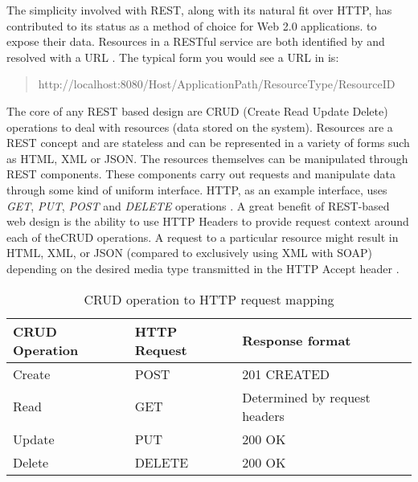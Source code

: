 The simplicity involved with REST, along with its natural fit over HTTP, has contributed to its status as a method of choice for Web 2.0 applications.
to expose their data. 
Resources in a RESTful service are both identified by and resolved with a URL \cite{battle2008bridging}.
The typical form you would see a URL in is: 

\begin{quotation}
    http://localhost:8080/Host/ApplicationPath/ResourceType/ResourceID
\end{quotation}

The core of any REST based design are CRUD (Create Read Update Delete) operations to deal with resources (data stored on the system).
Resources are a REST concept and are stateless and can be represented in a variety of forms such as HTML, XML or JSON.
The resources themselves can be manipulated through REST components. These components carry out requests and manipulate data through some kind
of uniform interface. HTTP, as an example interface, uses \textit{GET}, \textit{PUT}, \textit{POST} and \textit{DELETE} operations \cite{cdimascio2013restdesign}.
A great benefit of REST-based web design is the ability to use HTTP Headers to provide request context around each of theCRUD operations.
A request to a particular resource might result in HTML, XML, or JSON (compared to exclusively using XML with SOAP) depending on the desired
media type transmitted in the HTTP Accept header \cite{battle2008bridging}.


\begin{table} [ht]
    \begin{center}
        \begin{tabular}{ |l|l|l| }
            \hline
            CRUD Operation & HTTP Request & Response format\\
            \hline
            Create & POST & 201 CREATED\\ 
            Read & GET & Determined by request headers\\  
            Update & PUT & 200 OK \\   
            Delete & DELETE & 200 OK \\
            \hline
        \end{tabular}
        \caption{CRUD operation to HTTP request mapping}
    \end{center}           
\end{table}

